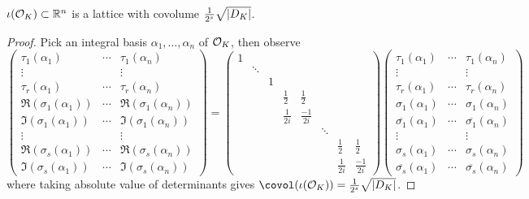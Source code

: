 \documentclass{article}
\begin{document}
\begin{lemma}
    $\iota(\mathcal{O}_K)\subset \mathbb{R}^n$ is a lattice with covolume $\frac{1}{2^s}\sqrt{\left| D_K \right|}$.\begin{proof}
        Pick an integral basis $\alpha_1,\ldots,\alpha_n$ of $\mathcal{O}_K$, then observe \[
        \begin{pmatrix}
            \tau_1(\alpha_1) & \cdots & \tau_1(\alpha_n) \\
            \vdots & & \vdots \\
            \tau_r(\alpha_1) & \cdots & \tau_r(\alpha_n) \\
            \Re(\sigma_1(\alpha_1)) & \cdots & \Re(\sigma_1(\alpha_n)) \\
            \Im(\sigma_1(\alpha_1)) & \cdots & \Im(\sigma_1(\alpha_n)) \\
            \vdots & & \vdots \\
            \Re(\sigma_s(\alpha_1)) & \cdots & \Re(\sigma_s(\alpha_n)) \\
            \Im(\sigma_s(\alpha_1)) & \cdots & \Im(\sigma_s(\alpha_n))
        \end{pmatrix} = 
        \begin{pmatrix}
            1 \\
            & \ddots \\
            & & 1 \\
            & & & \frac{1}{2} & \frac{1}{2} \\
            & & & \frac{1}{2i} & \frac{-1}{2i} \\
            & & & & & \ddots \\
            & & & & & & \frac{1}{2} & \frac{1}{2} \\
            & & & & & & \frac{1}{2i} & \frac{-1}{2i}
        \end{pmatrix}
        \begin{pmatrix}
            \tau_1(\alpha_1) & \cdots & \tau_1(\alpha_n) \\
            \vdots & & \vdots \\
            \tau_r(\alpha_1) & \cdots & \tau_r(\alpha_n) \\
            \sigma_1(\alpha_1) & \cdots & \sigma_1(\alpha_n) \\
            \overline{\sigma_1}(\alpha_1) & \cdots & \overline{\sigma_1}(\alpha_n) \\
            \vdots & & \vdots \\
            \sigma_s(\alpha_1) & \cdots & \sigma_s(\alpha_n) \\
            \overline{\sigma_s}(\alpha_1) & \cdots & \overline{\sigma_s}(\alpha_n)
        \end{pmatrix}
        \] where taking absolute value of determinants gives $\covol(\iota(\cO_K)) = \frac{1}{2^s}\sqrt{\abs{D_K}}$.
    \end{proof}
\end{lemma}
\end{document}
